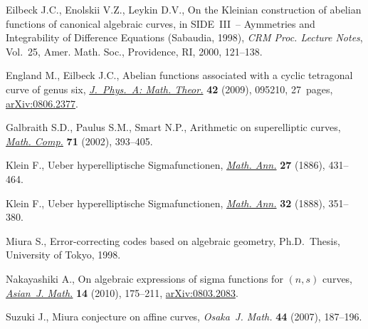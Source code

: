 \documentclass[pdftex]{sigma}
\numberwithin{equation}{section}
\theoremstyle{definition}
\begin{document}
\begin{thebibliography}{99}
Eilbeck J.C., Enolskii V.Z., Leykin D.V., On the {K}leinian construction of
 abelian functions of canonical algebraic curves, in S{IDE}~{III}~--
 Aymmetries and Integrability of Dif\/ference Equations ({S}abaudia, 1998),
 \textit{CRM Proc. Lecture Notes}, Vol.~25, Amer. Math. Soc., Providence, RI,
 2000, 121--138.

England M., Eilbeck J.C., Abelian functions associated with a cyclic tetragonal
 curve of genus six, \href{https://doi.org/10.1088/1751-8113/42/9/095210}{\textit{J.~Phys.~A: Math. Theor.}} \textbf{42} (2009),
 095210, 27~pages, \href{http://arxiv.org/abs/0806.2377}{arXiv:0806.2377}.

Galbraith S.D., Paulus S.M., Smart N.P., Arithmetic on superelliptic curves,
 \href{https://doi.org/10.1090/S0025-5718-00-01297-7}{\textit{Math. Comp.}} \textbf{71} (2002), 393--405.

Klein F., Ueber hyperelliptische {S}igmafunctionen, \href{https://doi.org/10.1007/BF01445285}{\textit{Math. Ann.}}
 \textbf{27} (1886), 431--464.

Klein F., Ueber hyperelliptische {S}igmafunctionen, \href{https://doi.org/10.1007/BF01443606}{\textit{Math. Ann.}}
 \textbf{32} (1888), 351--380.

Miura S., Error-correcting codes based on algebraic geometry, Ph.D.~Thesis,
 University of Tokyo, 1998.

Nakayashiki A., On algebraic expressions of sigma functions for {$(n,s)$}
 curves, \href{https://doi.org/10.4310/AJM.2010.v14.n2.a2}{\textit{Asian~J. Math.}} \textbf{14} (2010), 175--211,
 \href{http://arxiv.org/abs/0803.2083}{arXiv:0803.2083}.

Suzuki J., Miura conjecture on af\/f\/ine curves, \textit{Osaka~J. Math.}
 \textbf{44} (2007), 187--196.

\end{thebibliography}\LastPageEnding
\end{document}

